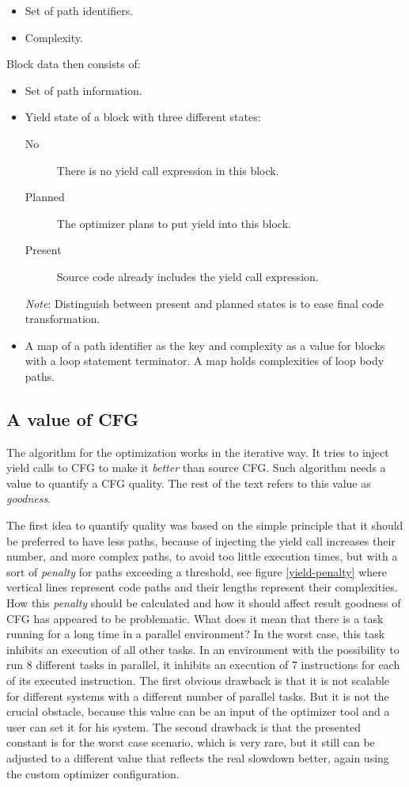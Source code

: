 \begin{itemize}
\item{Set of path identifiers.}
\item{Complexity.}
\end{itemize}
Block data then consists of:
\begin{itemize}
\item{Set of path information.}
\item{Yield state of a block with three different states:}
	\begin{description}
	\item[No]{There is no yield call expression in this block.}
	\item[Planned]{The optimizer plans to put yield into this block.}
	\item[Present]{Source code already includes the yield call expression.}
	\end{description}
	\emph{Note}: Distinguish between present and planned states is to ease final code transformation.
\item{A map of a path identifier as the key and complexity as a value for blocks with a loop statement terminator. A map holds complexities of loop body paths.}
\end{itemize}

\subsection{A value of CFG}
The algorithm for the optimization works in the iterative way. It tries to inject yield calls to CFG to make it \textit{better} than source CFG. Such algorithm needs a value to quantify a CFG quality. The rest of the text refers to this value as \emph{goodness}.

The first idea to quantify quality was based on the simple principle that it should be preferred to have less paths, because of injecting the yield call increases their number, and more complex paths, to avoid too little execution times, but with a sort of \emph{penalty} for paths exceeding a threshold, see figure \ref{yield-penalty} where vertical lines represent code paths and their lengths represent their complexities. How this \emph{penalty} should be calculated and how it should affect result goodness of CFG has appeared to be problematic. What does it mean that there is a task running for a long time in a parallel environment? In the worst case, this task inhibits an execution of all other tasks. In an environment with the possibility to run 8 different tasks in parallel, it inhibits an execution of 7 instructions for each of its executed instruction. The first obvious drawback is that it is not scalable for different systems with a different number of parallel tasks. But it is not the crucial obstacle, because this value can be an input of the optimizer tool and a user can set it for his system. The second drawback is that the presented constant is for the worst case scenario, which is very rare, but it still can be adjusted to a different value that reflects the real slowdown better, again using the custom optimizer configuration.


